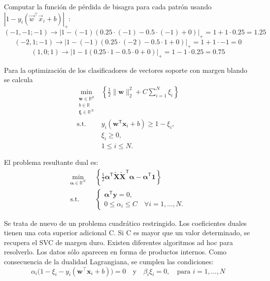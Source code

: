 Computar la función de pérdida de bisagra para cada patrón usando $|1 - y_i(\vec{w}^\intercal \vec{x}_i + b)|_+$:
$$(-1, -1; -1) \rightarrow |1 - (-1)(0.25 \cdot (-1) -0.5 \cdot (-1) + 0)|_+ = 1 + 1 \cdot 0.25 = 1.25$$
$$(-2, 1; -1) \rightarrow |1 - (-1)(0.25 \cdot (-2) -0.5 \cdot 1 + 0)|_+ = 1 + 1 \cdot -1 = 0$$
$$(1, 0; 1) \rightarrow |1 - 1(0.25 \cdot 1 -0.5 \cdot 0 + 0)|_+ = 1 - 1 \cdot 0.25 = 0.75$$

Para la optimización de los clasificadores de vectores soporte con margen blando se calcula
\begin{align*}
\min_{\substack{\mathbf{w} \in \mathbb{R}^d \\ 
                  b \in \mathbb{R} \\
                  \boldsymbol{\xi} \in \mathbb{R}^N}} 
&\left\{
    \frac{1}{2}\|\mathbf{w}\|_2^2 + C \sum_{i=1}^N \xi_i
\right\} \\
\text{s.t.} \quad
& y_i(\mathbf{w}^{\mathsf{T}}\mathbf{x}_i + b) \geq 1 - \xi_i, \\
& \xi_i \geq 0, \\
& 1 \leq i \leq N.
\end{align*}

El problema resultante dual es:
\begin{align*}
\min_{\boldsymbol{\alpha} \in \mathbb{R}^N} &\;\; 
\left\{
    \frac{1}{2}\boldsymbol{\alpha}^{\mathsf{T}}\widetilde{\mathbf{X}}\widetilde{\mathbf{X}}^{\mathsf{T}}\boldsymbol{\alpha} - \boldsymbol{\alpha}^{\mathsf{T}}\mathbf{1}
\right\} \\
\text{s.t.} &\;\; 
\begin{cases} 
    \boldsymbol{\alpha}^{\mathsf{T}}\mathbf{y} = 0, \\
    0 \leq \alpha_i \leq C \quad \forall i = 1,\ldots,N.
\end{cases}
\end{align*}

Se trata de nuevo de un problema cuadrático restringido. Los coeficientes duales tienen una cota superior adicional C. Si C es mayor que un valor determinado, se recupera el SVC de margen duro. Existen diferentes algoritmos ad hoc para resolverlo. Los datos sólo aparecen en forma de productos internos. Como consecuencia de la dualidad Lagrangiana, se cumplen las condiciones:
$$\alpha_i \big(1 - \xi_i - y_i (\mathbf{w}^\top \mathbf{x}_i + b)\big) = 0 \quad \text{y} \quad \beta_i \xi_i = 0, \quad \text{para } i = 1, \ldots, N$$

